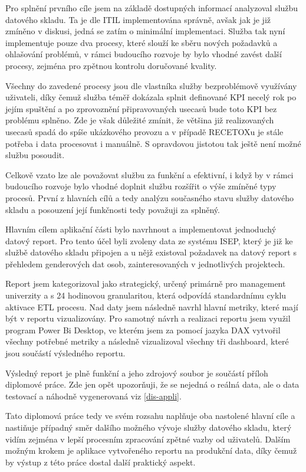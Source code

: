 \documentclass[
  digital,     %
  twoside,     %
  lof,         %
  lot,         %
]{fithesis4}
\begin{document}
Pro splnění prvního cíle jsem na základě dostupných informací analyzoval službu datového skladu. Ta je dle ITIL implementována správně, avšak jak je již zmíněno v diskusi, jedná se zatím o minimální implementaci.  Služba tak nyní implementuje pouze dva procesy, které slouží ke sběru nových požadavků a ohlašování problémů, v rámci budoucího rozvoje by bylo vhodné zavést další procesy, zejména pro zpětnou kontrolu doručované kvality. 

Všechny do zavedené procesy jsou dle vlastníka služby bezproblémově využívány uživateli, díky čemuž služba téměř dokázala splnit definované KPI necelý rok po jejím spuštění a po zprovoznění připravovaných usecasů bude toto KPI bez problému splněno. Zde je však důležité zmínit, že většina již realizovaných usecasů spadá do spíše ukázkového provozu a v případě RECETOXu je stále potřeba i data procesovat i manuálně. S opravdovou jistotou tak ještě není možné službu posoudit.

Celkově vzato lze ale považovat službu za funkční a efektivní, i když by v rámci budoucího rozvoje bylo vhodné doplnit službu rozšířit o výše zmíněné typy procesů. První z hlavních cílů a tedy analýzu současného stavu služby datového skladu a posouzení její funkčnosti tedy považuji za splněný. 

Hlavním cílem aplikační části bylo navrhnout a implementovat jednoduchý datový report. Pro tento účel byli zvoleny data ze systému ISEP, který je již ke službě datového skladu připojen a u nějž existoval požadavek na datový report s přehledem genderových dat osob, zainteresovaných v jednotlivých projektech. 

Report jsem kategorizoval jako strategický, určený primárně pro management univerzity a s 24 hodinovou granularitou, která odpovídá standardnímu cyklu aktivace ETL procesu. 
Nad daty jsem následně navrhl hlavní metriky, které mají být v reportu vizualizovány. Pro samotný návrh a realizaci reportu jsem využil program Power Bi Desktop, ve kterém jsem za pomocí jazyka DAX vytvořil všechny potřebné metriky a následně vizualizoval všechny tři dashboard, které jsou součástí výsledného reportu. 

Výsledný report je plně funkční a jeho zdrojový soubor je součástí příloh diplomové práce. Zde jen opět upozorňuji, že se nejedná o reálná data, ale o data testovací a náhodně vygenerovaná viz \ref{dis-appli}.

Tato diplomová práce tedy ve svém rozsahu naplňuje oba nastolené hlavní cíle a nastiňuje případný směr dalšího možného vývoje služby datového skladu, který vidím zejména v lepší procesním zpracování zpětné vazby od uživatelů. Dalším možným krokem je aplikace vytvořeného reportu na produkční data, díky čemuž by výstup z této práce dostal další praktický aspekt. 
\end{document}
